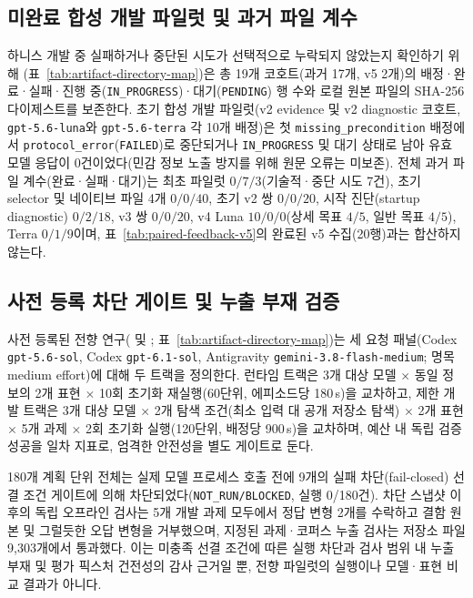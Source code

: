 \documentclass[journal]{IEEEtran}
\begin{document}
\subsection{미완료 합성 개발 파일럿 및 과거 파일 계수}
하니스 개발 중 실패하거나 중단된 시도가 선택적으로 누락되지 않았는지 확인하기 위해 (표~\ref{tab:artifact-directory-map})은 총 19개 코호트(과거 17개, v5 2개)의 배정·완료·실패·진행 중(\texttt{IN\_PROGRESS})·대기(\texttt{PENDING}) 행 수와 로컬 원본 파일의 SHA-256 다이제스트를 보존한다. 초기 합성 개발 파일럿(v2 evidence 및 v2 diagnostic 코호트, \texttt{gpt-5.6-luna}와 \texttt{gpt-5.6-terra} 각 10개 배정)은 첫 \texttt{missing\_precondition} 배정에서 \texttt{protocol\_error}(\texttt{FAILED})로 중단되거나 \texttt{IN\_PROGRESS} 및 대기 상태로 남아 유효 모델 응답이 0건이었다(민감 정보 노출 방지를 위해 원문 오류는 미보존). 전체 과거 파일 계수(완료·실패·대기)는 최초 파일럿 $0/7/3$(기술적·중단 시도 7건), 초기 selector 및 네이티브 파일 4개 $0/0/40$, 초기 v2 쌍 $0/0/20$, 시작 진단(startup diagnostic) $0/2/18$, v3 쌍 $0/0/20$, v4 Luna $10/0/0$(상세 목표 $4/5$, 일반 목표 $4/5$), Terra $0/1/9$이며, 표~\ref{tab:paired-feedback-v5}의 완료된 v5 수집(20행)과는 합산하지 않는다.

\subsection{사전 등록 차단 게이트 및 누출 부재 검증}\label{sec:prospective-pilot}
사전 등록된 전향 연구( 및 ; 표~\ref{tab:artifact-directory-map})는 세 요청 패널(Codex \texttt{gpt-5.6-sol}, Codex \texttt{gpt-6.1-sol}, Antigravity \texttt{gemini-3.8-flash-medium}; 명목 medium effort)에 대해 두 트랙을 정의한다. 런타임 트랙은 3개 대상 모델 $\times$ 동일 정보의 2개 표현 $\times$ 10회 초기화 재실행(60단위, 에피소드당 180\,s)을 교차하고, 제한 개발 트랙은 3개 대상 모델 $\times$ 2개 탐색 조건(최소 입력 대 공개 저장소 탐색) $\times$ 2개 표현 $\times$ 5개 과제 $\times$ 2회 초기화 실행(120단위, 배정당 900\,s)을 교차하며, 예산 내 독립 검증 성공을 일차 지표로, 엄격한 안전성을 별도 게이트로 둔다.



180개 계획 단위 전체는 실제 모델 프로세스 호출 전에 9개의 실패 차단(fail-closed) 선결 조건 게이트에 의해 차단되었다(\texttt{NOT\_RUN/BLOCKED}, 실행 0/180건). 차단 스냅샷 이후의 독립 오프라인 검사는 5개 개발 과제 모두에서 정답 변형 2개를 수락하고 결함 원본 및 그럴듯한 오답 변형을 거부했으며, 지정된 과제·코퍼스 누출 검사는 저장소 파일 9,303개에서 통과했다. 이는 미충족 선결 조건에 따른 실행 차단과 검사 범위 내 누출 부재 및 평가 픽스처 건전성의 감사 근거일 뿐, 전향 파일럿의 실행이나 모델·표현 비교 결과가 아니다.
\clearpage
\end{document}

